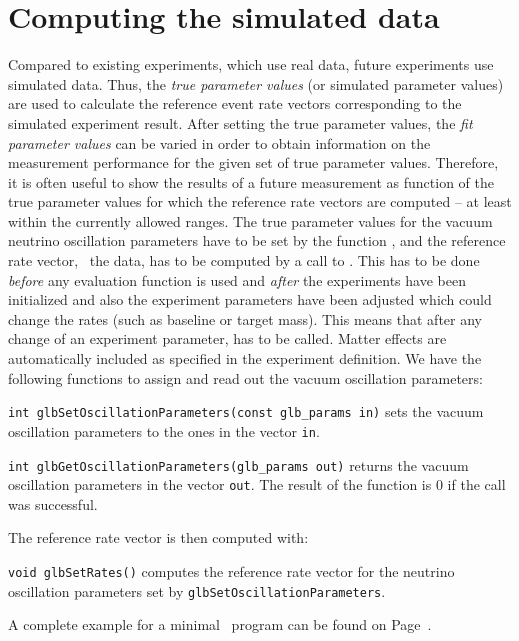 \section{Computing the simulated data}

Compared to existing experiments, which use real data, future experiments
use simulated data. Thus, the {\em true parameter values} (or simulated
parameter values) are used to calculate the reference event rate vectors
corresponding to the simulated experiment result. After setting the 
true parameter values, the {\em fit parameter values} can be varied in order to 
obtain information on the measurement performance for the given set of true 
parameter values. Therefore, it is often useful to show the results of a 
future measurement as function of the true parameter values for which the 
reference rate vectors are computed -- at least within the currently allowed 
ranges. The true parameter values for the vacuum neutrino oscillation 
parameters have to be set by the function , 
and the reference rate vector, \ie\ the data, has to be computed by a call 
to .
This has to be done {\em before} any evaluation 
function is used and  {\em after} the experiments have been initialized and 
also the experiment 
parameters have been adjusted which could change the rates (such as baseline
 or target mass). This means that
after any change of an experiment parameter,  has to be 
called. Matter effects are automatically included as specified in the 
experiment definition. We have the following functions to assign and
read out the vacuum oscillation parameters:
\begin{function}
{\tt int glbSetOscillationParameters(const glb\_params in)} sets the
vacuum oscillation parameters to the ones in the vector {\tt in}.
\end{function}
\begin{function}
{\tt int glbGetOscillationParameters(glb\_params out)} returns the
vacuum oscillation parameters in the vector {\tt out}. The result of
the function is $0$ if the call was successful.
\end{function}
The reference rate vector is then computed with:
\begin{function}
{\tt void glbSetRates()} computes the reference rate vector for the neutrino oscillation parameters set by {\tt glbSetOscillationParameters}. 
\end{function}
A complete example for a minimal \GLOBES\ program can be found on
Page~\pageref{ex:c}.

